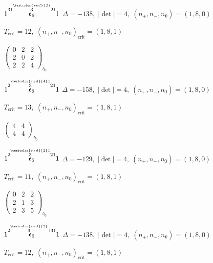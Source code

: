 \documentclass[10pt]{article}
\begin{document}
\smallskip

$1\overset{31\overset{\textcolor{red}{2}}{3}21}{\mathfrak{e}_6}1$ \quad $\Delta=-138,\; |\det|=4,\; (n_+,n_-,n_0)=(1,8,0)$

\hspace{1em}$T_{\text{crit}}=12,\; (n_+,n_-,n_0)_{\text{crit}}=(1,8,1)$

\hspace{2em}$\left(\begin{smallmatrix}0 & 2 & 2 \\ 2 & 0 & 2 \\ 2 & 2 & 4\end{smallmatrix}\right)_{\!b_0}$

\smallskip

$1\overset{2\overset{\textcolor{red}{4}1}{3}21}{\mathfrak{e}_6}1$ \quad $\Delta=-158,\; |\det|=4,\; (n_+,n_-,n_0)=(1,8,0)$

\hspace{1em}$T_{\text{crit}}=13,\; (n_+,n_-,n_0)_{\text{crit}}=(1,8,1)$

\hspace{2em}$\left(\begin{smallmatrix}4 & 4 \\ 4 & 4\end{smallmatrix}\right)_{\!b_0}$

$1\overset{2\overset{\textcolor{red}{2}1}{3}21}{\mathfrak{e}_6}1$ \quad $\Delta=-129,\; |\det|=4,\; (n_+,n_-,n_0)=(1,8,0)$

\hspace{1em}$T_{\text{crit}}=11,\; (n_+,n_-,n_0)_{\text{crit}}=(1,8,1)$

\hspace{2em}$\left(\begin{smallmatrix}0 & 2 & 2 \\ 2 & 1 & 3 \\ 2 & 3 & 5\end{smallmatrix}\right)_{\!b_0}$

\smallskip

$1\overset{2\overset{\textcolor{red}{2}}{3}131}{\mathfrak{e}_6}1$ \quad $\Delta=-138,\; |\det|=4,\; (n_+,n_-,n_0)=(1,8,0)$

\hspace{1em}$T_{\text{crit}}=12,\; (n_+,n_-,n_0)_{\text{crit}}=(1,8,1)$
\end{document}
